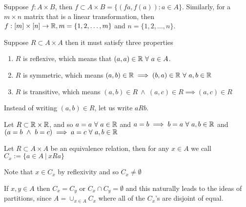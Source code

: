 \documentclass[12pt]{scrartcl}
\begin{document}
\begin{note}
  Suppose $f: A \times B$, then $f \subset A \times B = \{(fa, f(a)): a \in A\}$. Similarly, for a $m \times n$ matrix 
  that is a linear transformation, then $f: [m] \times [n] \to \mathbb R, m = \{1, 2, \ldots, m\}$ and $n = \{1, 2, \ldots, n\}$.
\end{note}

\begin{definition}
  Suppose $R \subset A \times A$ then it must satisfy three properties
  \begin{enumerate}
    \item $R$ is reflexive, which means that $(a,a) \in \mathbb R \ \forall \ a \in A$.
    \item $R$ is symmetric, which means $(a,b) \in \mathbb R \implies (b, a) \in \mathbb R \ \forall \ a, b \in \mathbb R$
    \item $R$ is transitive, which means $(a, b) \in R \ \land \ (a, c) \in R \implies (a,c) \in R$
  \end{enumerate}
\end{definition}

\begin{note}
  Instead of writing $(a, b) \in R$, let us write $aRb$. 
\end{note}

\begin{example}
  Let $R \subset \mathbb R \times \mathbb R$, and so $a=a \ \forall \ a \in \mathbb R$ and $a = b \implies b = a \ \forall \ a, b \in \mathbb R$ and 
  $(a = b \ \land \ b = c) \implies a = c \ \forall \ a, b \in \mathbb R$ 
\end{example}

\begin{definition}
  Let $R \subset A \times A$ be an equivalence relation, then for any $x \in A$ we call 
  $C_x := \{a \in A \ | \ xRa\}$ 
\end{definition}
  
\begin{note}
  Note that $x \in C_x$ by reflexivity and so $C_x \neq \emptyset$
\end{note}

\begin{note}
  If $x, y \in A$ then $C_x = C_y$ or $C_x \cap C_y = \emptyset$ and this naturally leads to the 
  ideas of partitions, since $A = \cup_{x \in A} C_x$ where all of the $C_x$'s are disjoint of equal.
\end{note}
\end{document}

